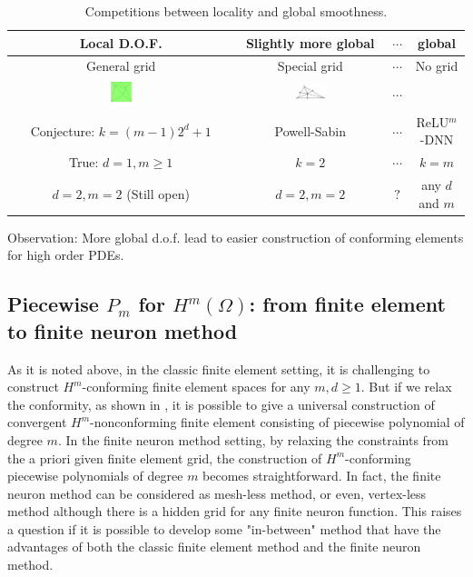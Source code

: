  \begin{center}
 \begin{table}[!ht]
\begin{tabular}{|c|c|c|c|}
\hline
Local D.O.F.  &Slightly more global &$\cdots$ &global \\
\hline
General grid& Special grid& $\cdots$ &No grid\\
\includegraphics[width=0.15\textwidth]{6DL/figures/unstructureGrid.pdf} &\includegraphics[width=0.22\textwidth]{6DL/figures/PowellSabin2.png} &$\cdots$ & \\
Conjecture: $k=(m-1)2^d+1$  &  Powell-Sabin \cite{powell1977piecewise}&  $\cdots$ & ReLU$^m$-DNN \\
True: $d=1,m\ge 1$ &    $k=2$ &   $\cdots$ & $k=m$     \\
$d=2,m=2$ (Still open)  & $d=2,m=2$ & $?$&  any $d$ and $m$ \\
\hline
\end{tabular}
\caption{Competitions between locality and global smoothness.}
\label{compare}
\end{table}
\end{center}
Observation: More global d.o.f. lead to easier
construction of conforming elements for high order PDEs.

\subsection{Piecewise $P_m$ for $H^m(\Omega)$: from finite element to
  finite neuron method} \label{sec:concluding} As it is noted above,
in the classic finite element setting, it is challenging to construct
$H^m$-conforming finite element spaces for any $m, d\ge 1$.  But if we
relax the conformity, as shown in \cite{wang2013minimal}, it is
possible to give a universal construction of convergent
$H^m$-nonconforming finite element consisting of piecewise polynomial
of degree $m$.  In the finite neuron method setting, by relaxing the
constraints from the a priori given finite element grid, the
construction of $H^m$-conforming piecewise polynomials of degree $m$
becomes straightforward.  In fact, the finite neuron method can be
considered as mesh-less method, or even, vertex-less method although
there is a hidden grid for any finite neuron function.  This raises a
question if it is possible to develop some "in-between" method that have
the advantages of both the classic finite element method and the
finite neuron method. 

